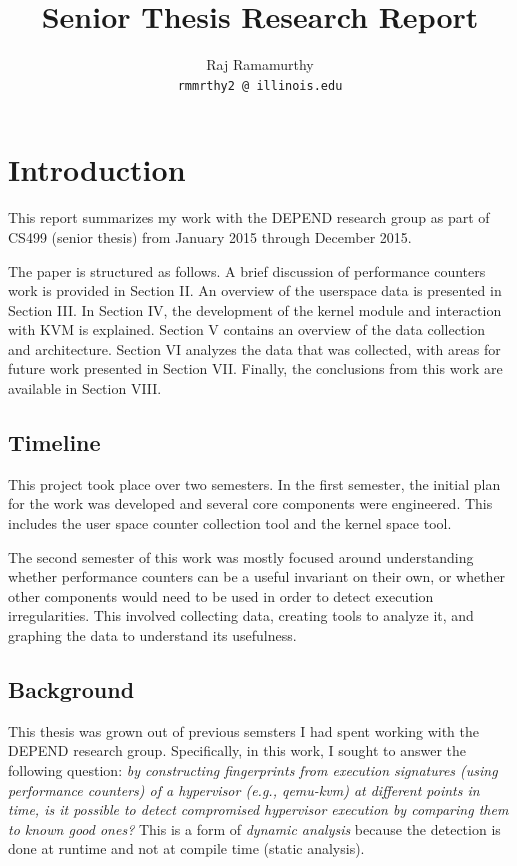 \documentclass[notitlepage]{article}
\begin{document}
\title{Senior Thesis Research Report}
\author{Raj Ramamurthy\\
  \texttt{rmmrthy2 @ illinois.edu}}
\maketitle


\section{Introduction}
This report summarizes my work with the DEPEND research group as part of CS499
(senior thesis) from January 2015 through December 2015.

The paper is structured as follows. A brief discussion of performance counters
work is provided in Section II. An overview of the userspace data is presented
in Section III. In Section IV, the development of the kernel module and
interaction with KVM is explained. Section V contains an overview of the data
collection and architecture. Section VI analyzes the data that was collected,
with areas for future work presented in Section VII. Finally, the conclusions
from this work are available in Section VIII.

\subsection{Timeline}
This project took place over two semesters. In the first semester, the initial
plan for the work was developed and several core components were engineered.
This includes the user space counter collection tool and the kernel space tool.

The second semester of this work was mostly focused around understanding whether
performance counters can be a useful invariant on their own, or whether other
components would need to be used in order to detect execution irregularities.
This involved collecting data, creating tools to analyze it, and graphing the
data to understand its usefulness.

\subsection{Background}
This thesis was grown out of previous semsters I had spent working with the
DEPEND research group. Specifically, in this work,  I sought to answer the
following question:
\textit{by constructing fingerprints
    from execution signatures (using performance counters) of a hypervisor
    (e.g., qemu-kvm) at different points in time, is it possible to detect
    compromised hypervisor execution by comparing them to known good ones?} This
    is a form of \textit{dynamic analysis} because the detection is done at
    runtime and not at compile time (static analysis).
\end{document}
